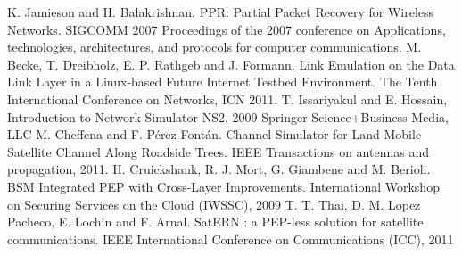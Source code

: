 \documentclass[conference,letterpaper]{IEEEtran}
\begin{document}
\begin{thebibliography}{1}
 K. Jamieson and H. Balakrishnan. PPR: Partial Packet Recovery for Wireless Networks. SIGCOMM 2007 Proceedings of the 2007 conference on Applications, technologies, architectures, and protocols for computer communications.
 M. Becke, T. Dreibholz, E. P. Rathgeb and J. Formann. Link Emulation on the Data Link Layer in a Linux-based Future Internet Testbed Environment. The Tenth International Conference on Networks, ICN 2011. 
 T. Issariyakul and E. Hossain, Introduction to Network Simulator NS2, 2009 Springer Science+Business Media, LLC
 M. Cheffena and F. P\'{e}rez-Font\'{a}n. Channel Simulator for Land Mobile Satellite Channel Along Roadside Trees. IEEE Transactions on antennas and propagation, 2011.
 H. Cruickshank, R. J. Mort, G. Giambene and M. Berioli. BSM Integrated PEP with Cross-Layer Improvements. International Workshop on Securing Services on the Cloud (IWSSC), 2009 
 T. T. Thai, D. M. Lopez Pacheco, E. Lochin and F. Arnal. SatERN : a PEP-less solution for satellite communications. IEEE International Conference on Communications (ICC), 2011
\end{thebibliography}
\end{document}
